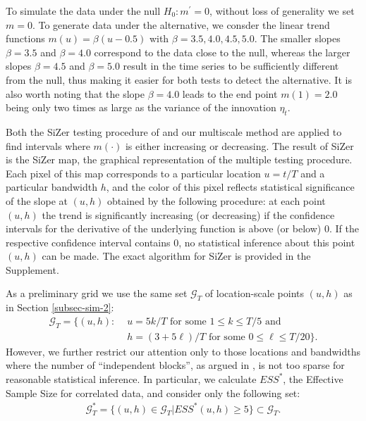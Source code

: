 \documentclass[a4paper,12pt]{article}
\begin{document}
To simulate the data under the null $H_0: m^\prime = 0$, without loss of generality we set $ m = 0$. To generate data under the alternative, we consder the linear trend functions $m(u) = \beta (u - 0.5)$ with $\beta = 3.5, 4.0, 4.5, 5.0$. The smaller slopes $\beta = 3.5$ and $\beta = 4.0$ correspond to the data close to the null, whereas the larger slopes $\beta = 4.5$ and $\beta = 5.0$ result in the time series to be sufficiently different from the null, thus making it easier for both tests to detect the alternative. It is also worth noting that the slope $\beta = 4.0$ leads to the end point $m(1) = 2.0$ being only two times as large as the variance of the innovation $\eta_t$.
 
Both the SiZer testing procedure of \cite{Rondonotti2007} and our multiscale method are applied to find intervals where $m(\cdot)$ is either increasing or decreasing. The result of SiZer is the SiZer map, the graphical representation of the multiple testing procedure. Each pixel of this map corresponds to a particular location $u = t/T$ and a particular bandwidth $h$, and the color of this pixel reflects statistical significance of the slope at $(u, h)$ obtained by the following procedure: at each point $(u, h)$ the trend is significantly increasing (or decreasing) if the confidence intervals for the derivative of the underlying function is above (or below) $0$. If the respective confidence interval contains $0$, no statistical inference about this point $(u, h)$ can be made. The exact algorithm for SiZer is provided in the Supplement. 

As a preliminary grid we use the same set $\mathcal{G}_T$ of location-scale points $(u,h)$ as in Section \ref{subsec-sim-2}:
\begin{align}
\mathcal{G}_T = \big\{ (u, h): & \, \, u = 5k/T \text{ for some } 1 \le k \le T/5 \text{ and } \nonumber \\ & \, \, h = (3+5\ell)/T \text{ for some } 0 \le \ell \le T/20 \big\}.
\end{align}
However, we further restrict our attention only to those locations and bandwidths where the number of ``independent blocks'', as argued in \cite{Rondonotti2007}, is not too sparse for reasonable statistical inference. In particular, we calculate $ESS^*$, the Effective Sample Size for correlated data, and consider only the following set:
\begin{align}
\mathcal{G}_T^*  = \big\{ (u, h)\in \mathcal{G}_T| ESS^*(u, h) \geq 5\}\subset \mathcal{G}_T.
\end{align}
\end{document}
